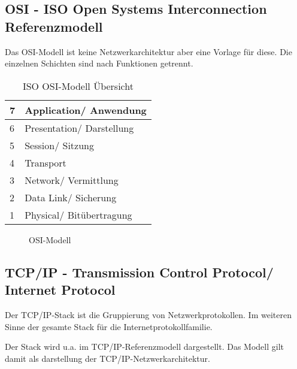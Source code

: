 \subsection{OSI - ISO Open Systems Interconnection Referenzmodell}

Das OSI-Modell ist keine Netzwerkarchitektur aber eine Vorlage für diese. Die einzelnen Schichten sind nach Funktionen getrennt.

\begin{table}[H]
    \centering
    \begin{tabular}{|l|l|}
        \hline
        7 & Application/ Anwendung    \\\hline
        6 & Presentation/ Darstellung \\\hline
        5 & Session/ Sitzung          \\\hline
        4 & Transport                 \\\hline
        3 & Network/ Vermittlung      \\\hline
        2 & Data Link/ Sicherung      \\\hline
        1 & Physical/ Bitübertragung  \\\hline
    \end{tabular}
    \caption{ISO OSI-Modell Übersicht}
\end{table}

\begin{figure}[H]
    \centering
    
    \caption{OSI-Modell}
\end{figure}
\FloatBarrier

\subsection{TCP/IP - Transmission Control Protocol/ Internet Protocol}

Der TCP/IP-Stack ist die Gruppierung von Netzwerkprotokollen. Im weiteren Sinne der gesamte Stack für die Internetprotokollfamilie.

Der Stack wird u.a. im TCP/IP-Referenzmodell dargestellt. Das Modell gilt damit als darstellung der TCP/IP-Netzwerkarchitektur.

